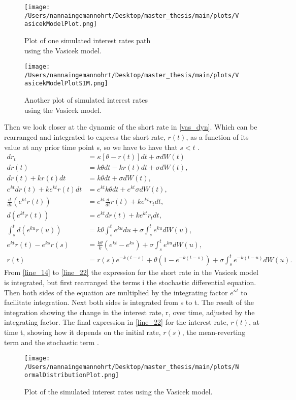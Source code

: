 \begin{figure}[h]
    \centering
    \begin{minipage}{0.5\textwidth}
        \texttt{[image: /Users/nannaingemannohrt/Desktop/master\_thesis/main/plots/VasicekModelPlot.png]}
        \caption{Plot of one simulated interest rates path \\ using the Vasicek model.}
        \label{fig:vasicek}
    \end{minipage}\hfill 
    \begin{minipage}{0.5\textwidth}
        \texttt{[image: /Users/nannaingemannohrt/Desktop/master\_thesis/main/plots/VasicekModelPlotSIM.png]}
        \caption{Another plot of simulated interest rates \\using the Vasicek model.}
        \label{fig:vasicek-sim}
    \end{minipage}
\end{figure}

\noindent
Then we look closer at the dynamic of the short rate in \autoref{vas_dyn}. Which can be rearranged and integrated
to express the short rate, $r(t)$, as a function of its value at any prior time point s,
so we have to have that $s < t$ \cite{Bermudan}. 
\begin{align}
    d r_t &= \kappa \left[\theta - r(t)\right] dt + \sigma d W(t) \label{line_14} \\
    d r(t) &= k \theta dt - k r(t) dt + \sigma d W(t),  \\
    d r(t) + k r(t) dt &= k \theta dt + \sigma d W(t), \\
    e^{kt} d r(t) + k e^{kt} r(t) dt &= e^{kt} k \theta dt + e^{kt} \sigma d W(t), \\
    \frac{d}{dt} \left( e^{k t} r(t) \right) &= e^{k t} \frac{d}{dt} r(t) + k e^{k t} r_t dt, \\
    d\left( e^{k t} r(t) \right) &= e^{k t} dr(t) + k e^{k t} r_t dt, \\
    \int_s^t d \left( e^{ku} r(u) \right) &= k \theta \int_s^t e^{ku} du + \sigma \int_s^t e^{ku} d W(u), \\
    e^{kt} r(t) - e^{k s} r(s) &= \frac{k \theta}{k} \left( e^{kt} - e^{ks} \right) + \sigma \int_s^t e^{ku} d W(u), \\
    r(t) &= r(s) e^{-k(t-s)} + \theta \left( 1 - e^{-k(t-s)} \right) + \sigma \int_s^t e^{-k(t-u)} d W(u). \label{line_22}
\end{align}
From \autoref{line_14} to \autoref{line_22} the expression for the short rate in the Vasicek model is integrated, but first
rearranged the terms i the stochastic differential equation. Then both sides of the equation are multiplied by the 
integrating factor $e^{\kappa t}$ to facilitate integration. Next both sides is integrated from s to t. The result of the
integration showing the change in the interest rate, r, over time, adjusted by the integrating factor. The final 
expression in \autoref{line_22} for the interest rate, $r(t)$, at time t, showing how it depends on the initial rate, $r(s)$,
the mean-reverting term and the stochastic term \cite{Bermudan}. 

\begin{figure}[h]
    \centering
    \texttt{[image: /Users/nannaingemannohrt/Desktop/master\_thesis/main/plots/NormalDistributionPlot.png]}
    \caption{Plot of the simulated interest rates using the Vasicek model.}
    \label{fig:rates:hist}
\end{figure}